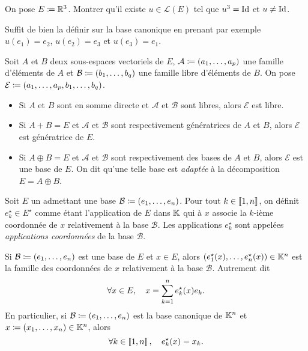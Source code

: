 \documentclass{magnolia}
\begin{document}
\begin{exoUnique}
\exo On pose $E\coloneqq\mathbb{R}^3$. Montrer qu'il existe $u\in\mathcal{L}(E)$ tel que
  $u^3=\operatorname{Id}$ et $u\neq \operatorname{Id}$.
  \begin{sol}
  Suffit de bien la définir sur la base canonique en prenant par exemple $u(e_1)=e_2$, $u(e_2)=e_3$ et $u(e_3)=e_1$.
  \end{sol}
\end{exoUnique}

\begin{proposition}
Soit $A$ et $B$ deux sous-espaces vectoriels de $E$, $\mathcal{A}\coloneqq(a_1,\ldots,a_p)$ une famille d'éléments de $A$ et
$\mathcal{B}\coloneqq(b_1,\ldots,b_q)$ une famille libre d'éléments de $B$. On pose $\mathcal{E}\coloneqq(a_1,\ldots,a_p,b_1,\ldots,b_q)$.
\begin{itemize}
\item Si $A$ et $B$ sont en somme directe et $\mathcal{A}$ et $\mathcal{B}$ sont libres, alors $\mathcal{E}$ est libre.
\item Si $A+B=E$ et $\mathcal{A}$ et $\mathcal{B}$ sont respectivement génératrices de $A$ et $B$, alors
  $\mathcal{E}$ est génératrice de $E$.
\item Si $A\oplus B=E$ et $\mathcal{A}$ et $\mathcal{B}$ sont respectivement des bases de $A$ et $B$, alors
  $\mathcal{E}$ est une base de $E$. On dit qu'une telle base est \emph{adaptée} à la
  décomposition $E=A\oplus B$.
\end{itemize}
\end{proposition}

\begin{definition}
Soit $E$ un \Kev admettant une base $\mathcal{B}\coloneqq(e_1,\ldots,e_n)$. Pour tout $k\in\left\llbracket 1,n\right\rrbracket$,
on définit $e_k^\star\in E^\star$ comme étant l'application de $E$ dans $\mathbb{K}$ qui à $x$ associe la
$k$-ième coordonnée de $x$ relativement à la base $\mathcal{B}$. Les applications $e_k^\star$ sont
appelées \emph{applications coordonnées} de la base $\mathcal{B}$.
\end{definition}

\begin{remarques}
\remarque Si $\mathcal{B}\coloneqq(e_1,\ldots,e_n)$ est une base de $E$ et $x\in E$,
  alors $(e_1^\star(x),\ldots,e_n^\star(x))\in\mathbb{K}^n$ est la famille des coordonnées de $x$
  relativement à la base $\mathcal{B}$. Autrement dit
  \[\forall x\in E,\quad x=\sum_{k=1}^n e_k^{\star}(x)e_k.\]
\remarque En particulier, si $\mathcal{B}\coloneqq(e_1,\ldots,e_n)$ est la base canonique
  de $\mathbb{K}^n$ et $x\coloneqq(x_1,\ldots,x_n)\in\mathbb{K}^n$, alors
  \[\forall k\in\left\llbracket 1,n\right\rrbracket,\quad e_k^\star(x)=x_k.\]
\end{remarques}
\end{document}
